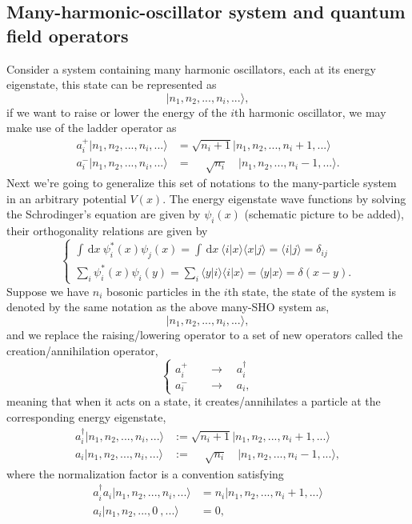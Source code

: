 \documentclass{article}
\newcommand{\be}{\begin{equation}}
\newcommand{\ee}{\end{equation}}
\newcommand{\dif}{\,\mathrm{d}}
\renewcommand{\1}{\left}
\renewcommand{\2}{\right}
\newcommand{\la}{\langle}
\newcommand{\ra}{\rangle}
\newcommand{\del}{\delta}
\begin{document}
\subsection{Many-harmonic-oscillator system and quantum field operators}
Consider a system containing many harmonic oscillators, each at its energy eigenstate, this state can be represented as
\be
|n_1, n_2,...,n_i,...\ra,
\ee
if we want to raise or lower the energy of the $i$th harmonic oscillator, we may make use of the ladder operator as
\be\begin{split}
a_i^+|n_1, n_2,...,n_i,...\ra&=\sqrt{n_i+1}|n_1, n_2,...,n_i+1,...\ra\\
a_i^-|n_1, n_2,...,n_i,...\ra&=\phantom{+}\sqrt{n_i}\phantom{10}|n_1, n_2,...,n_i-1,...\ra.
\end{split}\ee
Next we're going to generalize this set of notations to the many-particle system in an arbitrary potential $V(x)$. The energy eigenstate wave functions by solving the Schrodinger's equation are given by $\psi_i(x)$ (schematic picture to be added), their orthogonality relations are given by
\be\1\{\begin{split}
\int\dif x\  \psi_i^*(x)\psi_j(x)=\int\dif x\ \la i|x\ra \la x|j\ra=\la i|j\ra=\del_{ij}\\
\sum_i \psi_i^*(x)\psi_i(y)=\sum_i \la y|i\ra\la i|x\ra =\la y|x\ra=\del(x-y).
\end{split}\2.\ee
Suppose we have $n_i$ bosonic particles in the $i$th state, the state of the system is denoted by the same notation as the above many-SHO system as,
\be
|n_1, n_2,...,n_i,...\ra,
\ee
and we replace the raising/lowering operator to a set of new operators called the creation/annihilation operator,
\be\1\{\begin{split}
a^+_i &\quad\rightarrow\quad a_i^\dag\\
a^-_i &\quad\rightarrow\quad a_i,
\end{split}\2.\ee
meaning that when it acts on a state, it creates/annihilates a particle at the corresponding energy eigenstate,
\be\begin{split}
a_i^\dag|n_1, n_2,...,n_i,...\ra&:=\sqrt{n_i+1}|n_1, n_2,...,n_i+1,...\ra\\
a_i|n_1, n_2,...,n_i,...\ra&:=\phantom{+}\sqrt{n_i}\phantom{10}|n_1, n_2,...,n_i-1,...\ra,
\end{split}\ee
where the normalization factor is a convention satisfying
\be\begin{split}
a_i^\dag a_i|n_1, n_2,...,n_i,...\ra&=n_i|n_1, n_2,...,n_i+1,...\ra\\
a_i|n_1, n_2,...,0\ ,...\ra&=0,
\end{split}\ee
\end{document}
